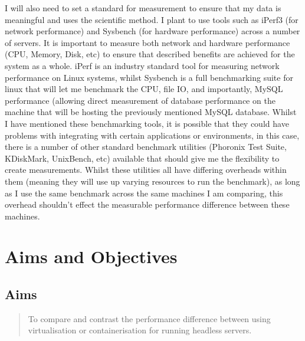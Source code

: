 I will also need to set a standard for measurement to ensure that my data is meaningful and uses the scientific method. I plant to use tools such as iPerf3 (for network performance) and Sysbench (for hardware performance) across a number of servers. It is important to measure both network and hardware performance (CPU, Memory, Disk, etc) to ensure that described  benefits are achieved for the system as a whole. iPerf is an industry standard tool for measuring network performance on Linux systems, whilst Sysbench is a full benchmarking suite for linux that will let me benchmark the CPU, file IO, and importantly, MySQL performance (allowing direct measurement of database performance on the machine that will be hosting the previously mentioned MySQL database. Whilst I have mentioned these benchmarking tools, it is possible that they could have problems with integrating with certain applications or environments, in this case, there is a number of other standard benchmark utilities (Phoronix Test Suite, KDiskMark, UnixBench, etc) available that should give me the flexibility to create measurements. Whilst these utilities all have differing overheads within them (meaning they will use up varying resources to run the benchmark), as long as I use the same benchmark across the same machines I am comparing, this overhead shouldn't effect the measurable performance difference between these machines.

\section{Aims and Objectives}

\subsection{Aims}
\begin{quote}

To compare and contrast the performance difference between using virtualisation or containerisation for running headless servers.


\end{quote}

